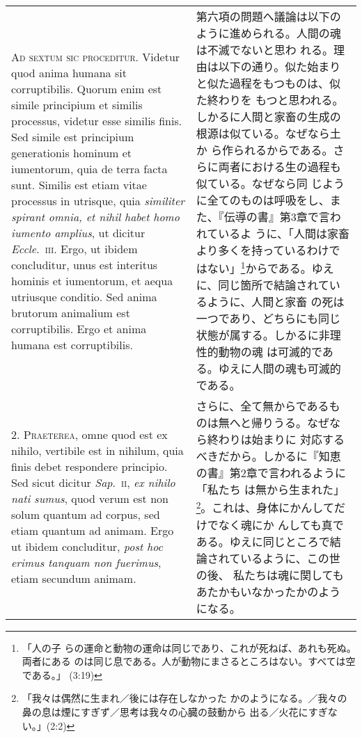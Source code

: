 \documentclass[paper=a4paper,fontsize=10pt,jafontsize=9pt,titlepage]{jlreq}
\begin{document}
\begin{longtable}{p{21em}p{21em}}

{\scshape Ad sextum sic proceditur}. Videtur quod anima humana sit
corruptibilis. Quorum enim est simile principium et similis processus,
videtur esse similis finis. Sed simile est principium generationis
hominum et iumentorum, quia de terra facta sunt. Similis est etiam
vitae processus in utrisque, quia {\itshape similiter spirant omnia, et nihil
habet homo iumento amplius}, ut dicitur {\itshape Eccle}.~{\scshape iii}. Ergo, ut ibidem
concluditur, unus est interitus hominis et iumentorum, et aequa
utriusque conditio. Sed anima brutorum animalium est
corruptibilis. Ergo et anima humana est corruptibilis.


&

第六項の問題へ議論は以下のように進められる。人間の魂は不滅でないと思わ
れる。理由は以下の通り。似た始まりと似た過程をもつものは、似た終わりを
もつと思われる。しかるに人間と家畜の生成の根源は似ている。なぜなら土か
ら作られるからである。さらに両者における生の過程も似ている。なぜなら同
じように全てのものは呼吸をし、また、『伝導の書』第3章で言われているよ
うに、「人間は家畜より多くを持っているわけではない」\footnote{「人の子
らの運命と動物の運命は同じであり、これが死ねば、あれも死ぬ。両者にある
のは同じ息である。人が動物にまさるところはない。すべては空である。」
(3:19)}からである。ゆえに、同じ箇所で結論されているように、人間と家畜
の死は一つであり、どちらにも同じ状態が属する。しかるに非理性的動物の魂
は可滅的である。ゆえに人間の魂も可滅的である。


\\



2. {\scshape Praeterea}, omne quod est ex nihilo, vertibile est in nihilum, quia
finis debet respondere principio. Sed sicut dicitur {\itshape Sap}.~{\scshape ii}, {\itshape ex nihilo
nati sumus}, quod verum est non solum quantum ad corpus, sed etiam
quantum ad animam. Ergo ut ibidem concluditur, {\itshape post hoc erimus tanquam
non fuerimus}, etiam secundum animam.


&

さらに、全て無からであるものは無へと帰りうる。なぜなら終わりは始まりに
対応するべきだから。しかるに『知恵の書』第2章で言われるように「私たち
は無から生まれた」\footnote{「我々は偶然に生まれ／後には存在しなかった
かのようになる。／我々の鼻の息は煙にすぎず／思考は我々の心臓の鼓動から
出る／火花にすぎない。」(2:2)}。これは、身体にかんしてだけでなく魂にか
んしても真である。ゆえに同じところで結論されているように、この世の後、
私たちは魂に関してもあたかもいなかったかのようになる。



\end{longtable}
\end{document}
